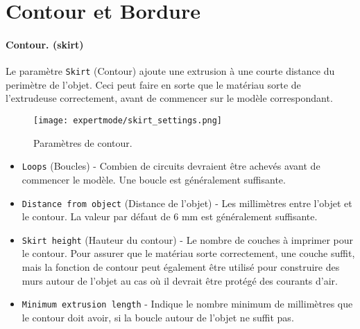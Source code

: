 
\section{Contour et Bordure} %
\label{sec:skirt}

\paragraph{Contour. (skirt)} %
Le param\`etre \texttt{Skirt} (Contour) ajoute une extrusion \`a une courte distance du perim\`etre de l'objet. Ceci peut faire en sorte que le mat\'eriau sorte de l'extrudeuse correctement, avant de commencer sur le mod\`ele correspondant.

\begin{figure}[H]
\centering
\texttt{[image: expertmode/skirt\_settings.png]}
\caption{Param\`etres de contour.}
\label{fig:skirt_settings}
\end{figure}

\begin{itemize}
    \item \texttt{Loops} (Boucles) - Combien de circuits devraient \^etre achev\'es avant de commencer le mod\`ele. Une boucle est g\'en\'eralement suffisante.
    \item \texttt{Distance from object} (Distance de l'objet) - Les millim\`etres entre l'objet et le contour. La valeur par d\'efaut de 6 mm est g\'en\'eralement suffisante.
    \item \texttt{Skirt height} (Hauteur du contour) - Le nombre de couches \`a imprimer pour le contour. Pour assurer que le mat\'eriau sorte correctement, une couche suffit, mais la fonction de contour peut \'egalement \^etre utilis\'e pour construire des murs autour de l'objet au cas o\`u il devrait \^etre prot\'eg\'e des courants d'air.
    \item \texttt{Minimum extrusion length} - Indique le nombre minimum de millim\`etres que le contour doit avoir, si la boucle autour de l'objet ne suffit pas.
\end{itemize}

